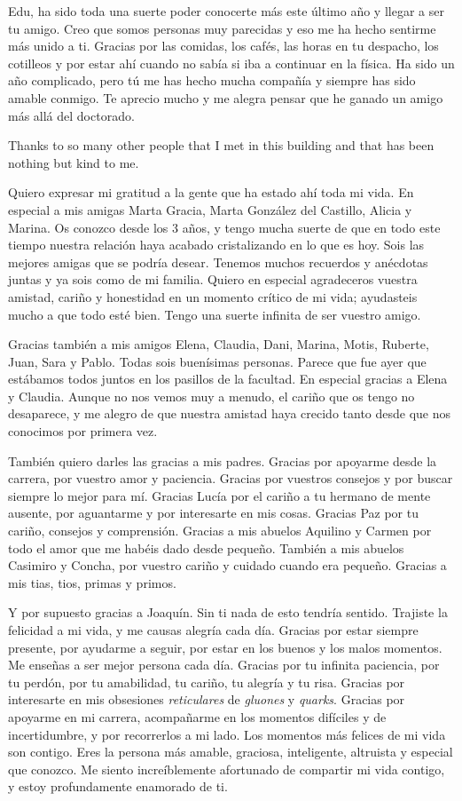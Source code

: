 Edu, ha sido toda una suerte poder conocerte más este último año y llegar a ser tu amigo. Creo que somos personas muy parecidas y eso me ha hecho sentirme más unido a ti. Gracias por las comidas, los cafés, las horas en tu despacho, los cotilleos y por estar ahí cuando no sabía si iba a continuar en la física. Ha sido un año complicado, pero tú me has hecho mucha compañía y siempre has sido amable conmigo. Te aprecio mucho y me alegra pensar que he ganado un amigo más allá del doctorado.

Thanks to so many other people that I met in this building and that has been nothing but kind to me. 

Quiero expresar mi gratitud a la gente que ha estado ahí toda mi vida. En especial a mis amigas Marta Gracia, Marta González del Castillo, Alicia y Marina. Os conozco desde los 3 años, y tengo mucha suerte de que en todo este tiempo nuestra relación haya acabado cristalizando en lo que es hoy. Sois las mejores amigas que se podría desear. Tenemos muchos recuerdos y anécdotas juntas y ya sois como de mi familia. Quiero en especial agradeceros vuestra amistad, cariño y honestidad en un momento crítico de mi vida; ayudasteis mucho a que todo esté bien. Tengo una suerte infinita de ser vuestro amigo.

Gracias también a mis amigos Elena, Claudia, Dani, Marina, Motis, Ruberte, Juan, Sara y Pablo. Todas sois buenísimas personas. Parece que fue ayer que estábamos todos juntos en los pasillos de la facultad. En especial gracias a Elena y Claudia. Aunque no nos vemos muy a menudo, el cariño que os tengo no desaparece, y me alegro de que nuestra amistad haya crecido tanto desde que nos conocimos por primera vez.

También quiero darles las gracias a mis padres. Gracias por apoyarme
desde la carrera, por vuestro amor y paciencia. Gracias por
vuestros consejos y por buscar siempre lo mejor para mí. Gracias Lucía
por el cariño a tu hermano de mente ausente, por aguantarme y por
interesarte en mis cosas. Gracias Paz por tu cariño, consejos y
comprensión. Gracias a mis abuelos Aquilino y Carmen por todo el amor
que me habéis dado desde pequeño. También a mis abuelos Casimiro y
Concha, por vuestro cariño y cuidado cuando era pequeño.
Gracias a mis tias, tios, primas y primos.

Y por supuesto gracias a Joaquín. Sin ti nada de esto tendría sentido. Trajiste la felicidad a mi vida, y me causas alegría cada día. Gracias por estar siempre presente, por ayudarme a seguir, por estar en los buenos y los malos momentos. Me enseñas a ser mejor persona cada día. Gracias por tu infinita paciencia, por tu perdón, por tu amabilidad, tu cariño, tu alegría y tu risa. Gracias por interesarte en mis obsesiones \textit{reticulares} de \textit{gluones} y \textit{quarks}. Gracias por apoyarme en mi carrera, acompañarme en los momentos difíciles y de incertidumbre, y por recorrerlos a mi lado. Los momentos más felices de mi vida son contigo. Eres la persona más amable, graciosa, inteligente, altruista y especial que conozco. Me siento increíblemente afortunado de compartir mi vida contigo, y estoy profundamente enamorado de ti.

